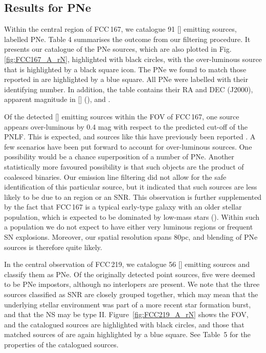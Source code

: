 \documentclass{aa}
\begin{document}
\subsection{Results for PNe}
Within the central region of FCC\,167, we catalogue 91 [] emitting sources, labelled PNe. Table 4 summarises the outcome from our filtering procedure. It presents our catalogue of the PNe sources, which are also plotted in Fig. \ref{fig:FCC167_A_rN}, highlighted with black circles, with the over-luminous source that is highlighted by a black square icon. The PNe we found to match those reported in \citet{feldmeier_calibrating_2007} are highlighted by a blue square. All PNe were labelled with their identifying number. In addition, the table contains their RA and DEC (J2000), apparent magnitude in [] (), and .


Of the detected [] emitting sources within the FOV of FCC\,167, one source appears over-luminous by 0.4 mag with respect to the predicted cut-off of the PNLF. This is expected, and sources like this have previously been reported \citep{jacoby_planetary_1996, longobardi_planetary_2013}. A few scenarios have been put forward to account for over-luminous sources. One possibility would be a chance superposition of a number of PNe. Another statistically more favoured possibility is that such objects are the product of coalesced binaries. Our emission line filtering did not allow for the safe identification of this particular source, but it indicated that such sources are less likely to be due to an  region or an SNR. This observation is further supplemented by the fact that FCC\,167 is a typical early-type galaxy with an older stellar population, which is expected to be dominated by low-mass stars (). Within such a population we do not expect to have either very luminous  regions or frequent SN explosions. Moreover, our spatial resolution spans 80pc, and blending of PNe sources is therefore quite likely.

In the central observation of FCC\,219, we catalogue 56 [] emitting sources and classify them as PNe. Of the originally detected point sources, five were deemed to be PNe impostors, although no interlopers are present. We note that the three sources classified as SNR are closely grouped together, which may mean that the underlying stellar environment was part of a more recent star formation burst, and that the NS may be type II. Figure~\ref{fig:FCC219_A_rN} shows the FOV, and the catalogued sources are highlighted with black circles, and those that matched sources of \citet{mcmillan_planetary_1993} are again highlighted by a blue square. See Table~5 for the properties of the catalogued sources.
\end{document}
